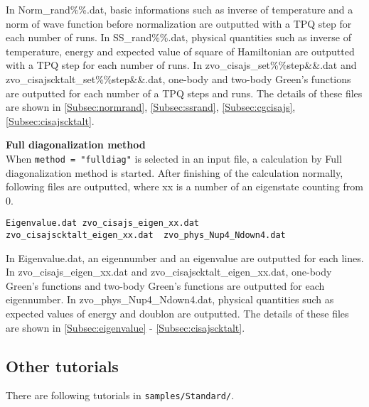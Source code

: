 \begin{description}
In Norm\_rand\%\%.dat, basic informations such as inverse of temperature and a norm of wave function before normalization are outputted with a TPQ step for each number of runs. In SS\_rand\%\%.dat, physical quantities such as inverse of temperature, energy and expected value of square of Hamiltonian are outputted with a TPQ step for each number of runs.  In zvo\_cisajs\_set\%\%step\&\&.dat and zvo\_cisajscktalt\_set\%\%step\&\&.dat, one-body and two-body Green's functions are outputted for each number of a TPQ steps and runs.
The details of these files are shown in \ref{Subsec:normrand}, \ref{Subsec:ssrand}, \ref{Subsec:cgcisajs}, \ref{Subsec:cisajscktalt}.

\item {\bf Full diagonalization method}\\
When \verb|method = "fulldiag"| is selected in an input file, a calculation by Full diagonalization method is started.
After finishing of the calculation normally, following files are outputted, where xx is a number of an eigenstate counting from 0. \\
\begin{minipage}{14cm}
\begin{screen}
\begin{verbatim}
Eigenvalue.dat zvo_cisajs_eigen_xx.dat
zvo_cisajscktalt_eigen_xx.dat  zvo_phys_Nup4_Ndown4.dat
\end{verbatim}
\end{screen}
\end{minipage}

In Eigenvalue.dat, an eigennumber and an eigenvalue are outputted for each lines.
In zvo\_cisajs\_eigen\_xx.dat and zvo\_cisajscktalt\_eigen\_xx.dat, one-body Green's functions and two-body Green's functions are outputted for each eigennumber. 
In zvo\_phys\_Nup4\_Ndown4.dat, physical quantities such as expected values of energy and doublon are outputted. The details of these files are shown in \ref{Subsec:eigenvalue} - \ref{Subsec:cisajscktalt}.


\end{description}

\subsection{Other tutorials}

There are following tutorials in
\verb|samples/Standard/|.

